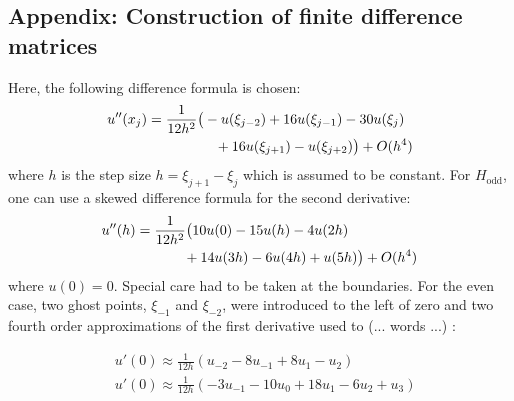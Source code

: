 \documentclass[twocolumn]{article}
\begin{document}
\begin{large}
\newpage
\newpage
\subsection*{Appendix: Construction of finite difference matrices}
Here, the following difference formula is chosen:
\begin{equation}
    \begin{split}
        u''(x_j) &= \frac{1}{12h^2}\big(-u(\xi_{j-2})+16u(\xi_{j-1})-30u(\xi_j) \\ 
        &\hspace{1.7cm}+16u(\xi_{j+1})-u(\xi_{j+2})\big) + O(h^4)
    \end{split}
\end{equation}
where $h$ is the step size $h = \xi_{j+1} - \xi_j$ which is assumed to be constant.
For $H_\text{odd}$, one can use a skewed difference formula for the second derivative:
\begin{equation}
    \begin{split}
    u''(h) &= \frac{1}{12h^2}\big(10u(0)-15u(h)-4u(2h) \\
    &\hspace{1.2cm} +14u(3h)-6u(4h)+u(5h)\big) + O(h^4)
    \end{split}
\end{equation}
where $u(0) = 0$. 
Special care had to be taken at the boundaries. For the even case, two ghost points, $\xi_{-1}$ and $\xi_{-2}$, were introduced to the left of zero and two fourth order approximations of the first derivative used to  (... words ...) :

\begin{equation}
    \begin{split}
        &u'(0) \approx \frac{1}{12h}\left(u_{-2}-8u_{-1}+8u_1-u_2\right) \\ 
        &u'(0) \approx \frac{1}{12h}\left(-3u_{-1}-10u_0+18u_1-6u_2+u_3\right)
    \end{split}
\end{equation}


\end{large}
\end{document}
